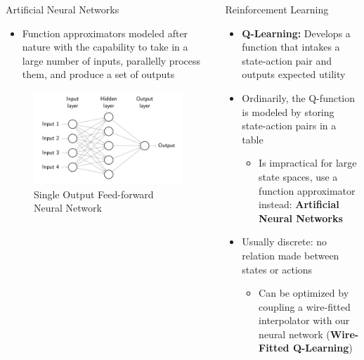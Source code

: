 \documentclass[final]{beamer}
\newlength{\onecolwid}
\newlength{\twocolwid}
\begin{document}
\begin{frame}[t]
\begin{columns}[t]
\begin{column}{\twocolwid}
\begin{columns}[t,totalwidth=\twocolwid]
\begin{column}{\onecolwid}\begin{block}{Artificial Neural Networks}
	\begin{itemize}
		\item Function approximators modeled after nature with the capability to take in a large number of inputs, parallelly process them, and produce a set of outputs
	\end{itemize}
	\vspace{-1.2cm}
	\begin{figure}
		\centering
		\includegraphics[width=.8\linewidth]{Figures/FeedForwardRendered}
		\caption{Single Output Feed-forward Neural Network}
		\label{fig:feedforward}
	\end{figure}
	\vspace{-3cm}
\end{block}\end{column}

\begin{column}{\onecolwid}\begin{block}{Reinforcement Learning}
	\begin{itemize}
		\item \textbf{Q-Learning:} Develops a function that intakes a state-action pair and outputs expected utility
		\item Ordinarily, the Q-function is modeled by storing state-action pairs in a table
		\begin{itemize}
			\item Is impractical for large state spaces, use a function approximator instead: \textbf{Artificial Neural Networks}
		\end{itemize}

		\item Usually discrete: no relation made between states or actions
		
		\begin{itemize}
			\item Can be optimized by coupling a wire-fitted interpolator with our neural network (\textbf{Wire-Fitted Q-Learning})
		\end{itemize}


\end{itemize}
\end{block}
\end{column}
\end{columns}
\end{column}
\end{columns}
\end{frame}
\end{document}
